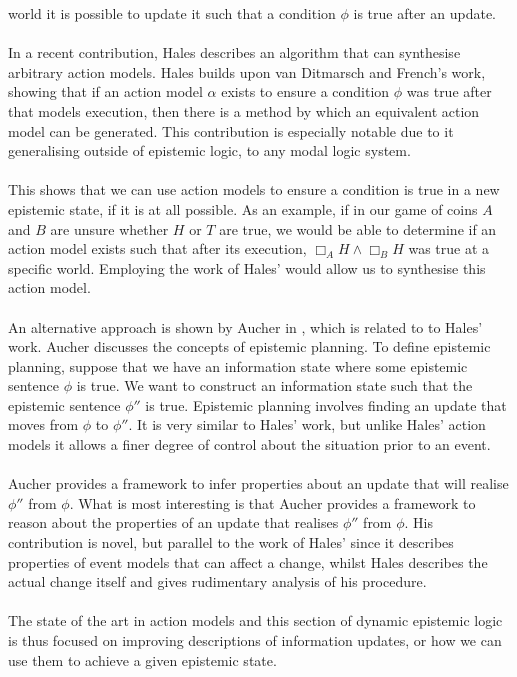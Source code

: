 world it is possible to update it such that a condition $\phi$ is true after an
update.\\
\\
In a recent contribution, Hales \cite{hales13synthesis} describes an algorithm that can synthesise arbitrary
action models.
Hales builds upon van Ditmarsch and French's work, showing that if an action
model $\alpha$ exists to ensure a condition $\phi$ was true after that models
execution, then there is a method by which an equivalent action model can be generated.
This contribution is especially notable due to it generalising outside of
epistemic logic, to any modal logic system.\\
\\
This shows that we can use action models to ensure a condition is true
in a new epistemic state, if it is at all possible.
As an example, if in our game of coins $A$ and $B$ are unsure whether $H$ or $T$
are true, we would be able to determine if an action model exists such that
after its execution, $\Box_A H \land \Box_B H$ was true at a
specific world.
Employing the work of Hales' would allow us to synthesise this action model.\\
\\
An alternative approach is shown by Aucher in
\cite{doi:10.3166/jancl.21.289-321,doi:10.1080/11663081.2012.736703}, which is related to
to Hales' work.
Aucher discusses the concepts of epistemic planning.
To define epistemic planning, suppose that we have an information state where
some epistemic sentence $\phi$ is true.
We want to construct an information state such that the epistemic sentence
$\phi''$ is true.
Epistemic planning involves finding an update that moves from $\phi$ to
$\phi''$.
It is very similar to Hales' work, but unlike Hales' action models it allows a
finer degree of control about the situation prior to an event.\\
\\
Aucher provides a framework to infer properties about an update that will
realise $\phi''$ from $\phi$.
What is most interesting is that Aucher provides a framework to reason about the
properties of an update that realises $\phi''$ from $\phi$.
His contribution is novel, but parallel to the work of Hales' since it describes properties of event
models that can affect a change, whilst Hales describes the actual change itself and gives
rudimentary analysis of his procedure.\\
\\
The state of the art in action models and this section of dynamic epistemic
logic is thus focused on improving descriptions of information updates, or how
we can use them to achieve a given epistemic state.

